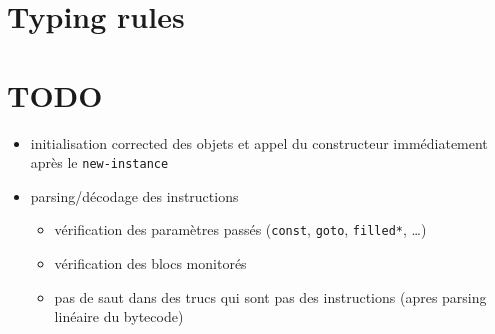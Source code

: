 \documentclass[english,dvips,ps2pdf,11pt]{article}
\theoremstyle{definition}
\newcommand{\bcode}[1]{\texttt{#1}\xspace}
\begin{document}
\appendix

\section{Typing rules}
%


\section{TODO}
\begin{itemize}
\item initialisation corrected des objets et appel du constructeur immédiatement après le \bcode{new-instance}
  
\item parsing/décodage des instructions
  \begin{itemize}
  \item vérification des paramètres passés (\bcode{const}, \bcode{goto}, \bcode{filled*}, \dots)
  \item vérification des blocs monitorés
  \item pas de saut dans des trucs qui sont pas des instructions (apres parsing linéaire du bytecode)
  \end{itemize}


\end{itemize}
\end{document}
